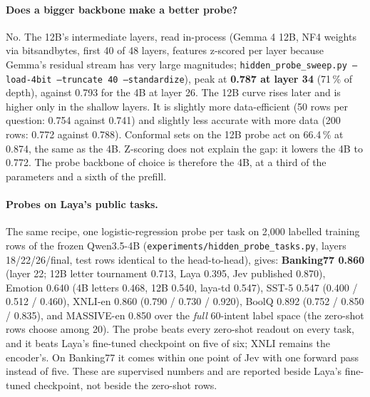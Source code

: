 \documentclass[11pt,a4paper]{article}
\newcommand{\code}[1]{\texttt{#1}}
\begin{document}
\paragraph{Does a bigger backbone make a better probe?} No. The 12B's intermediate layers, read in-process (Gemma 4 12B, NF4 weights via bitsandbytes, first 40 of 48 layers, features z-scored per layer because Gemma's residual stream has very large magnitudes; \code{hidden\_probe\_sweep.py --load-4bit --truncate 40 --standardize}), peak at \textbf{0.787 at layer 34} (71\,\% of depth), against 0.793 for the 4B at layer 26. The 12B curve rises later and is higher only in the shallow layers. It is slightly more data-efficient (50 rows per question: 0.754 against 0.741) and slightly less accurate with more data (200 rows: 0.772 against 0.788). Conformal sets on the 12B probe act on 66.4\,\% at 0.874, the same as the 4B. Z-scoring does not explain the gap: it lowers the 4B to 0.772. The probe backbone of choice is therefore the 4B, at a third of the parameters and a sixth of the prefill.

\paragraph{Probes on Laya's public tasks.} The same recipe, one logistic-regression probe per task on 2,000 labelled training rows of the frozen Qwen3.5-4B (\code{experiments/hidden\_probe\_tasks.py}, layers 18/22/26/final, test rows identical to the head-to-head), gives: \textbf{Banking77 0.860} (layer 22; 12B letter tournament 0.713, Laya 0.395, Jev published 0.870), Emotion 0.640 (4B letters 0.468, 12B 0.540, laya-td 0.547), SST-5 0.547 (0.400 / 0.512 / 0.460), XNLI-en 0.860 (0.790 / 0.730 / 0.920), BoolQ 0.892 (0.752 / 0.850 / 0.835), and MASSIVE-en 0.850 over the \emph{full} 60-intent label space (the zero-shot rows choose among 20). The probe beats every zero-shot readout on every task, and it beats Laya's fine-tuned checkpoint on five of six; XNLI remains the encoder's. On Banking77 it comes within one point of Jev with one forward pass instead of five. These are supervised numbers and are reported beside Laya's fine-tuned checkpoint, not beside the zero-shot rows.
\end{document}
